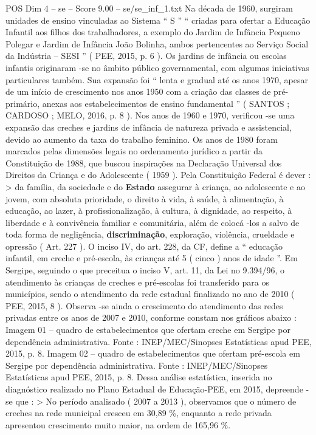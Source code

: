 \begin{textsample}{POS Dim 4 – se – Score 9.00 – se/se\_inf\_1.txt}
Na década de 1960, surgiram unidades de ensino vinculadas ao Sistema “ S ” “ criadas para ofertar a Educação Infantil aos filhos dos trabalhadores, a exemplo do Jardim de Infância Pequeno Polegar e Jardim de Infância João Bolinha, ambos pertencentes ao Serviço Social da Indústria – SESI ” ( PEE, 2015, p. 6 ).
Os jardins de infância ou escolas infantis originaram -se no âmbito público governamental, com algumas iniciativas particulares também.
Sua expansão foi “ lenta e gradual até os anos 1970, apesar de um início de crescimento nos anos 1950 com a criação das classes de pré-primário, anexas aos estabelecimentos de ensino fundamental ” ( SANTOS ; CARDOSO ; MELO, 2016, p. 8 ).
Nos anos de 1960 e 1970, verificou -se uma expansão das creches e jardins de infância de natureza privada e assistencial, devido ao aumento da taxa do trabalho feminino.
Os anos de 1980 foram marcados pelas dimensões legais no ordenamento jurídico a partir da Constituição de 1988, que buscou inspirações na Declaração Universal dos Direitos da Criança e do Adolescente ( 1959 ).
Pela Constituição Federal é dever : > da família, da sociedade e do \textbf{Estado} assegurar à criança, ao adolescente e ao jovem, com absoluta prioridade, o direito à vida, à saúde, à alimentação, à educação, ao lazer, à profissionalização, à cultura, à dignidade, ao respeito, à liberdade e à convivência familiar e comunitária, além de colocá -los a salvo de toda forma de negligência, \textbf{discriminação}, exploração, violência, crueldade e opressão ( Art. 227 ).
O inciso IV, do art. 228, da CF, define a “ educação infantil, em creche e pré-escola, às crianças até 5 ( cinco ) anos de idade ”.
Em Sergipe, seguindo o que preceitua o inciso V, art. 11, da Lei no 9.394/96, o atendimento às crianças de creches e pré-escolas foi transferido para os municípios, sendo o atendimento da rede estadual finalizado no ano de 2010 ( PEE, 2015, 8 ).
Observa -se ainda o crescimento do atendimento das redes privadas entre os anos de 2007 e 2010, conforme constam nos gráficos abaixo : Imagem 01 – quadro de estabelecimentos que ofertam creche em Sergipe por dependência administrativa.
Fonte : INEP/MEC/Sinopses Estatísticas apud PEE, 2015, p. 8.
Imagem 02 – quadro de estabelecimentos que ofertam pré-escola em Sergipe por dependência administrativa.
Fonte : INEP/MEC/Sinopses Estatísticas apud PEE, 2015, p. 8.
Dessa análise estatística, inserida no diagnóstico realizado no Plano Estadual de Educação-PEE, em 2015, depreende -se que : > No período analisado ( 2007 a 2013 ), observamos que o número de creches na rede municipal cresceu em 30,89 \%, enquanto a rede privada apresentou crescimento muito maior, na ordem de 165,96 \%.

\end{textsample}
